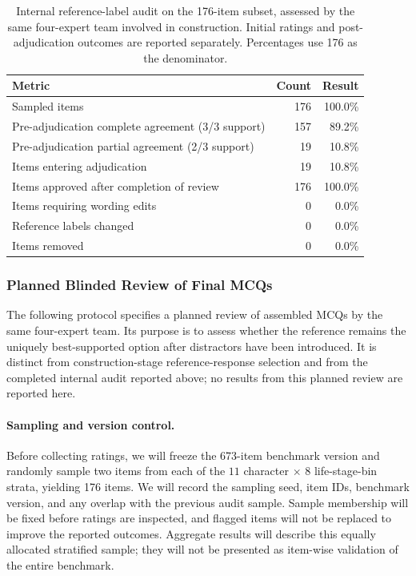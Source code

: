 \documentclass[11pt]{article}
\begin{document}
\begin{table}[t]
\centering
\caption{Internal reference-label audit on the 176-item subset, assessed by the same four-expert team involved in construction. Initial ratings and post-adjudication outcomes are reported separately. Percentages use 176 as the denominator.}
\label{tab:reference_label_audit}
\setlength{\tabcolsep}{3pt}
\small
\begin{tabularx}{\linewidth}{Xrr}
\toprule
\textbf{Metric} & \textbf{Count} & \textbf{Result} \\
\midrule
Sampled items & 176 & 100.0\% \\
\midrule
Pre-adjudication complete agreement (3/3 support) & 157 & 89.2\% \\
Pre-adjudication partial agreement (2/3 support) & 19 & 10.8\% \\
\midrule
Items entering adjudication & 19 & 10.8\% \\
Items approved after completion of review & 176 & 100.0\% \\
Items requiring wording edits & 0 & 0.0\% \\
Reference labels changed & 0 & 0.0\% \\
Items removed & 0 & 0.0\% \\
\bottomrule
\end{tabularx}
\end{table}


\subsubsection{Planned Blinded Review of Final MCQs}
\label{app:planned_blinded_review}

The following protocol specifies a planned review of assembled MCQs by the same four-expert team. Its purpose is to assess whether the reference remains the uniquely best-supported option after distractors have been introduced. It is distinct from construction-stage reference-response selection and from the completed internal audit reported above; no results from this planned review are reported here.

\paragraph{Sampling and version control.}
Before collecting ratings, we will freeze the 673-item benchmark version and randomly sample two items from each of the $11$ character $\times$ $8$ life-stage-bin strata, yielding 176 items. We will record the sampling seed, item IDs, benchmark version, and any overlap with the previous audit sample. Sample membership will be fixed before ratings are inspected, and flagged items will not be replaced to improve the reported outcomes. Aggregate results will describe this equally allocated stratified sample; they will not be presented as item-wise validation of the entire benchmark.
\end{document}
